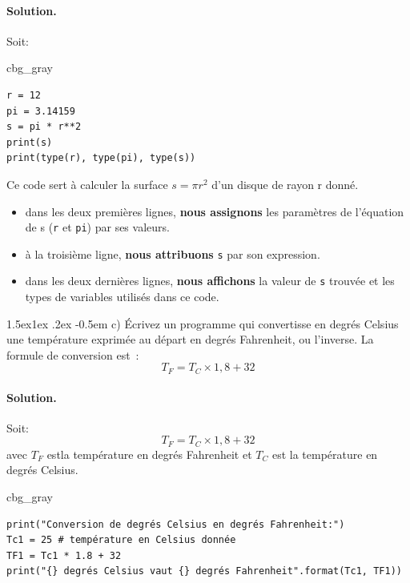 \documentclass[%
oneside,                 %
final,                   %
10pt,french]{article}
\makeatletter
\newenvironment{_cod_tight}[1]{
   \def\FrameCommand{\colorbox{#1}}
   \FrameRule0.6pt\MakeFramed {\FrameRestore}\vskip3mm}
   {\vskip0mm\endMakeFramed}
\newenvironment{cod}[1]{
\bgroup\rmfamily
\fboxsep=0mm\relax
\begin{_cod_tight}{#1}
\list{}{\parsep=-2mm\parskip=0mm\topsep=0pt\leftmargin=2mm
\rightmargin=2\leftmargin\leftmargin=4pt\relax}
\item\relax}
{\endlist\end{_cod_tight}\egroup}
\newenvironment{blockshaded}
{\def\FrameCommand{\fboxsep=3mm\colorbox{grayicon_block_background}}
 \MakeFramed {\advance\hsize-\width \FrameRestore}}{\endMakeFramed}
\newenvironment{block_grayiconadmon}[1][Block]{
\begin{blockshaded}
\noindent
 \textbf{#1}\par
\nobreak\noindent\ignorespaces
}
{
\end{blockshaded}
}
\newenvironment{doconceexercise}{}{}
\newcommand\subex{\@startsection{paragraph}{4}{\z@}%
                  {1.5ex\@plus1ex \@minus.2ex}%
                  {-0.5em}%
                  {\normalfont\normalsize\bfseries}}
\makeatother
\begin{document}
\begin{doconceexercise}
\paragraph{Solution.}
Soit:

\begin{cod}{cbg_gray}\begin{verbatim}
r = 12
pi = 3.14159
s = pi * r**2
print(s)
print(type(r), type(pi), type(s))
\end{verbatim}
\end{cod}
\noindent

\begin{block_grayiconadmon}[Description]
Ce code sert à calculer la surface $ s = \pi r^2$ d'un disque de rayon r donné.

\begin{itemize}
\item dans les deux premières lignes, \textbf{nous assignons} les paramètres de l'équation de s (\texttt{r} et \texttt{pi}) par ses valeurs.

\item à la troisième ligne, \textbf{nous attribuons} \texttt{s} par son expression.

\item dans les deux dernières lignes, \textbf{nous affichons} la valeur de \texttt{s} trouvée et les types de variables utilisés dans ce code.
\end{itemize}

\noindent
\end{block_grayiconadmon} %



\subex{c)}
Écrivez un programme qui convertisse en degrés Celsius une température exprimée au départ en degrés Fahrenheit, ou l’inverse. La formule de conversion est :
    $$T_F = T_C \times 1,8 + 32 $$


\paragraph{Solution.}
Soit:
 $$T_F = T_C \times 1,8 + 32 $$
 avec $T_F$ estla température en degrés Fahrenheit et $T_C$ est la température en degrés Celsius.

\begin{cod}{cbg_gray}\begin{verbatim}
print("Conversion de degrés Celsius en degrés Fahrenheit:")
Tc1 = 25 # température en Celsius donnée
TF1 = Tc1 * 1.8 + 32
print("{} degrés Celsius vaut {} degrés Fahrenheit".format(Tc1, TF1))


\end{verbatim}
\end{cod}
\end{doconceexercise}
\end{document}

